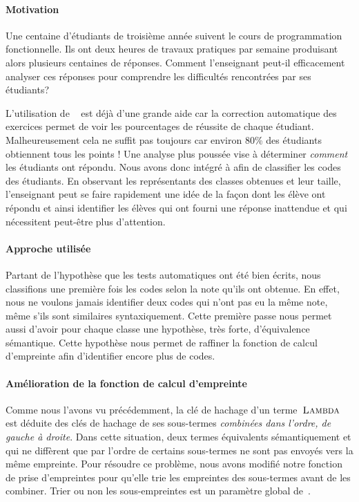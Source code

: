 \paragraph{Motivation}
Une centaine d'étudiants de troisième année suivent le cours de
programmation fonctionnelle. Ils ont deux heures de travaux pratiques
par semaine produisant alors plusieurs centaines de réponses. Comment
l'enseignant peut-il efficacement analyser ces réponses pour
comprendre les difficultés rencontrées par ses étudiants?

L'utilisation de {\LearnOCaml}~\cite{learnocaml} est déjà d'une grande
aide car la correction automatique des exercices permet de voir les
pourcentages de réussite de chaque étudiant. Malheureusement cela ne
suffit pas toujours car environ 80\% des étudiants obtiennent tous les
points ! Une analyse plus poussée vise à déterminer \emph{comment} les
étudiants ont répondu.
%
Nous avons donc intégré {\Asak} à {\LearnOCaml} afin de classifier les
codes des étudiants. En observant les représentants des classes
obtenues et leur taille, l'enseignant peut se faire rapidement une
idée de la façon dont les élève ont répondu et ainsi identifier les
élèves qui ont fourni une réponse inattendue et qui nécessitent
peut-être plus d'attention.

\paragraph{Approche utilisée}
Partant de l'hypothèse que les tests automatiques ont été bien écrits,
nous classifions une première fois les codes selon la note qu'ils ont
obtenue. En effet, nous ne voulons jamais identifier deux codes qui
n'ont pas eu la même note, même s'ils sont similaires
syntaxiquement. Cette première passe nous permet aussi d'avoir pour
chaque classe une hypothèse, très forte, d'équivalence sémantique.
Cette hypothèse nous permet de raffiner la fonction de calcul
d'empreinte afin d'identifier encore plus de codes.

\paragraph{Amélioration de la fonction de calcul d'empreinte}

Comme nous l'avons vu précédemment, la clé de hachage d'un
terme~$\textsc{Lambda}$ est déduite des clés de hachage de ses sous-termes
\textit{combinées dans l'ordre, de gauche à droite}. Dans cette
situation, deux termes équivalents sémantiquement et qui ne diffèrent
que par l'ordre de certains sous-termes ne sont pas envoyés vers la
même empreinte. Pour résoudre ce problème, nous avons modifié notre
fonction de prise d'empreintes pour qu'elle trie les empreintes des
sous-termes avant de les combiner. Trier ou non les sous-empreintes
est un paramètre global de~{\Asak}.

